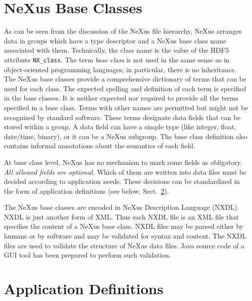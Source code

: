 \documentclass[%
 aip,
rsi,
 amsmath,amssymb,
 reprint,%
]{revtex4-1}
\begin{document}
\section{NeXus Base Classes}

As can be seen from the discussion of the NeXus file hierarchy, 
NeXus arranges data in groups which have a 
type descriptor and a NeXus base class name associated with them.
Technically, the class name is the value of the HDF5 attribute \texttt{NX_class}.
The term \emph{base class} is not used in the same sense as in  
object-oriented programming languages; in particular, there is no inheritance.
The NeXus base classes provide a comprehensive dictionary of terms 
that can be used for each class. The expected spelling and definition 
of each term is specified in the base classes. It is neither expected 
nor required to provide all the terms specified in a base class. 
Terms with other names are permitted but might not be recognized 
by standard software.
These terms designate data fields that can be stored within a group.
A data field can have a simple type (like integer, float, date/time, binary),
or it can be a NeXus subgroup.
The base class definition also contains informal annotations
about the semantics of each field.

At base class level, NeXus has no mechanism to mark some fields as obligatory.
\emph{All allowed fields are optional.}
Which of them are written into data files must be decided
according to application needs.
These decisions can be standardized in the form of
application definitions (see below, Sect.~\ref{sect_appdef}).

The NeXus base classes are encoded in NeXus Description Language (NXDL)\cite{nxman}. NXDL is 
just another form of XML. Thus each NXDL file is an XML file that specifies the content 
of a NeXus base class. 
NXDL files may be parsed either by humans or by software and 
may be validated for syntax and content.  The NXDL files are used to validate the structure of
NeXus data files. Java source code of a GUI tool has been prepared\cite{nxvalidate} to perform such validation.%


\section{Application Definitions}
  \label{sect_appdef}
\end{document}

